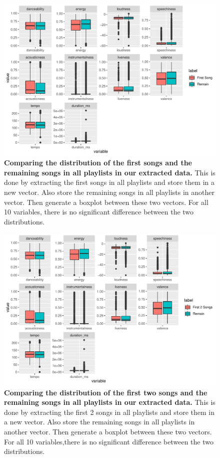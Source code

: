 \documentclass[12pt]{article}
\theoremstyle{plain}
\theoremstyle{definition}
\theoremstyle{remark}
\begin{document}
\begin{figure}[htp]
    \centering
    \includegraphics[width=\textwidth]{Images/1st.pdf}
    \caption{\textbf{Comparing the distribution of the first songs and the remaining songs in all playlists in our extracted data.} This is done by extracting the first songs in all playlists and store them in a new vector. Also store the remaining songs in all playlists in another vector. Then generate a boxplot between these two vectors. For all 10 variables, there is no significant difference between the two distributions.}
    \label{fig:1st}
\end{figure}

\begin{figure}[htp]
    \centering
    \includegraphics[width=\textwidth]{Images/1st2.pdf}
    \caption{\textbf{Comparing the distribution of the first two songs and the remaining songs in all playlists in our extracted data.} This is done by extracting the first 2 songs in all playlists and store them in a new vector. Also store the remaining songs in all playlists in another vector. Then generate a boxplot between these two vectors. For all 10 variables,there is no significant difference between the two distributions. }
    \label{fig:1st2}
\end{figure}
\end{document}
